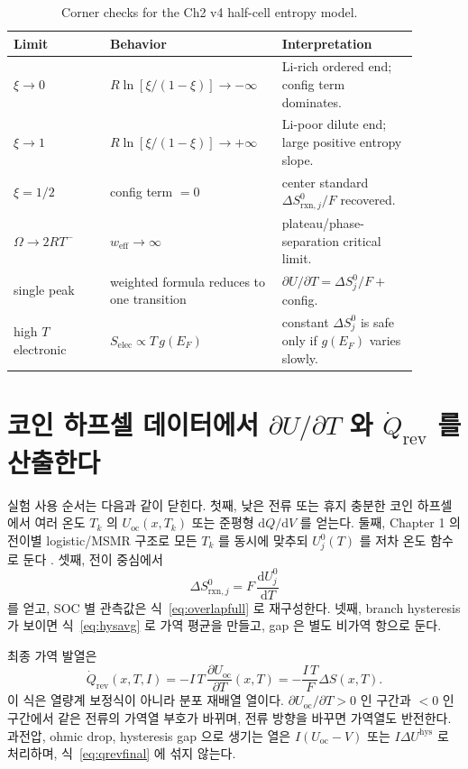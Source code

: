 \documentclass[11pt,a4paper]{article}
\newcommand{\dd}{\mathrm{d}}
\newcommand{\rxn}{\mathrm{rxn}}
\newcommand{\rev}{\mathrm{rev}}
\newcommand{\oc}{\mathrm{oc}}
\newcommand{\elec}{\mathrm{elec}}
\newcommand{\eff}{\mathrm{eff}}
\newcommand{\hys}{\mathrm{hys}}
\begin{document}
\begin{table}[t]
\centering\small
\renewcommand{\arraystretch}{1.14}
\caption{Corner checks for the Ch2 v4 half-cell entropy model.}
\label{tab:limits}
\begin{tabular}{p{0.22\linewidth}p{0.36\linewidth}p{0.31\linewidth}}
\toprule
Limit & Behavior & Interpretation \\
\midrule
$\xi\to0$ & $R\ln[\xi/(1-\xi)]\to-\infty$ & Li-rich ordered end; config term dominates. \\
$\xi\to1$ & $R\ln[\xi/(1-\xi)]\to+\infty$ & Li-poor dilute end; large positive entropy slope. \\
$\xi=1/2$ & config term $=0$ & center standard $\Delta S^0_{\rxn,j}/F$ recovered. \\
$\Omega\to2RT^-$ & $w_{\eff}\to\infty$ & plateau/phase-separation critical limit. \\
single peak & weighted formula reduces to one transition & $\partial U/\partial T=\Delta S^0_j/F+$ config. \\
high $T$ electronic & $S_{\elec}\propto T\,g(E_F)$ & constant $\Delta S^0_j$ is safe only if $g(E_F)$ varies slowly. \\
\bottomrule
\end{tabular}
\end{table}

\section{코인 하프셀 데이터에서 \texorpdfstring{$\partial U/\partial T$ 와 $\dot Q_\rev$}{dU/dT and reversible heat} 를 산출한다}\label{sec:usable}
실험 사용 순서는 다음과 같이 닫힌다. 첫째, 낮은 전류 또는 휴지 충분한 코인 하프셀에서 여러 온도
$T_k$ 의 $U_\oc(x,T_k)$ 또는 준평형 $\dd Q/\dd V$ 를 얻는다. 둘째, Chapter 1 의 전이별 logistic/MSMR
구조로 모든 $T_k$ 를 동시에 맞추되 $U_j^0(T)$ 를 저차 온도 함수로 둔다 \cite{msmr_partI,msmr_partII}.
셋째, 전이 중심에서
\begin{equation}
\Delta S^0_{\rxn,j}=F\,\frac{\dd U_j^0}{\dd T}
\label{eq:fitcenter}
\end{equation}
를 얻고, SOC 별 관측값은 식~\eqref{eq:overlapfull} 로 재구성한다. 넷째, branch hysteresis 가 보이면
식~\eqref{eq:hysavg} 로 가역 평균을 만들고, gap 은 별도 비가역 항으로 둔다.

최종 가역 발열은
\begin{equation}
\boxed{\;
\dot Q_\rev(x,T,I)
=-I\,T\,\frac{\partial U_\oc}{\partial T}(x,T)
=-\frac{I\,T}{F}\Delta S(x,T).
\;}
\label{eq:qrevfinal}
\end{equation}
이 식은 열량계 보정식이 아니라 분포 재배열 열이다. $\partial U_\oc/\partial T>0$ 인 구간과 $<0$ 인 구간에서
같은 전류의 가역열 부호가 바뀌며, 전류 방향을 바꾸면 가역열도 반전한다. 과전압, ohmic drop, hysteresis
gap 으로 생기는 열은 $I(U_\oc-V)$ 또는 $I\Delta U^{\hys}$ 로 처리하며, 식~\eqref{eq:qrevfinal} 에 섞지 않는다.
\end{document}
